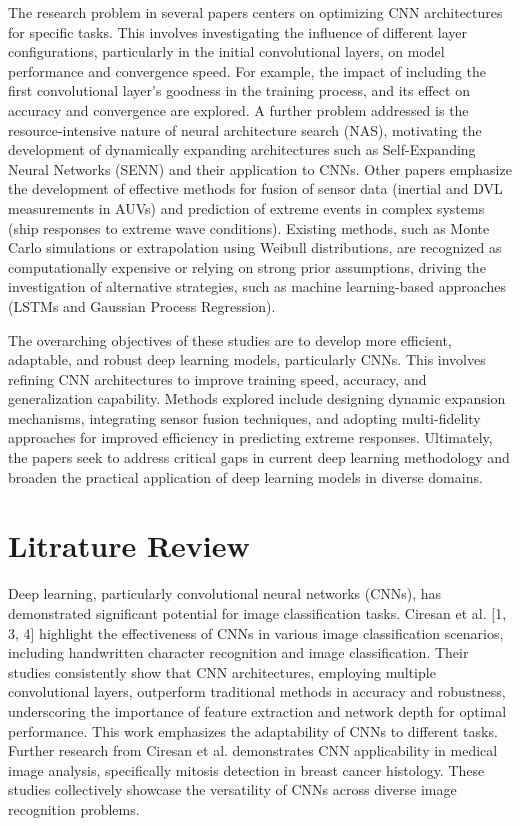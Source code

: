 \documentclass{article}
\begin{document}
The research problem in several papers centers on optimizing CNN architectures for specific tasks.  This involves investigating the influence of different layer configurations, particularly in the initial convolutional layers, on model performance and convergence speed.  For example, the impact of including the first convolutional layer's goodness in the training process, and its effect on accuracy and convergence are explored.  A further problem addressed is the resource-intensive nature of neural architecture search (NAS), motivating the development of dynamically expanding architectures such as Self-Expanding Neural Networks (SENN) and their application to CNNs.  Other papers emphasize the development of effective methods for fusion of sensor data (inertial and DVL measurements in AUVs) and prediction of extreme events in complex systems (ship responses to extreme wave conditions).  Existing methods, such as Monte Carlo simulations or extrapolation using Weibull distributions, are recognized as computationally expensive or relying on strong prior assumptions, driving the investigation of alternative strategies, such as machine learning-based approaches (LSTMs and Gaussian Process Regression).

The overarching objectives of these studies are to develop more efficient, adaptable, and robust deep learning models, particularly CNNs. This involves refining CNN architectures to improve training speed, accuracy, and generalization capability. Methods explored include designing dynamic expansion mechanisms, integrating sensor fusion techniques, and adopting multi-fidelity approaches for improved efficiency in predicting extreme responses. Ultimately, the papers seek to address critical gaps in current deep learning methodology and broaden the practical application of deep learning models in diverse domains.


\section*{Litrature Review}
Deep learning, particularly convolutional neural networks (CNNs), has demonstrated significant potential for image classification tasks.  Ciresan et al. [1, 3, 4]  highlight the effectiveness of CNNs in various image classification scenarios, including handwritten character recognition and image classification.  Their studies consistently show that CNN architectures, employing multiple convolutional layers,  outperform traditional methods in accuracy and robustness, underscoring the importance of feature extraction and network depth for optimal performance.  This work emphasizes the adaptability of CNNs to different tasks.  Further research from Ciresan et al. \cite{2} demonstrates CNN applicability in medical image analysis, specifically mitosis detection in breast cancer histology.   These studies collectively showcase the versatility of CNNs across diverse image recognition problems.
\end{document}
